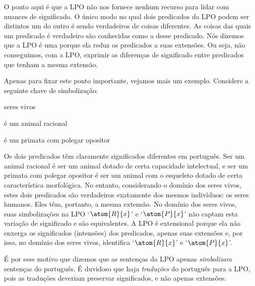 O ponto aqui é que a LPO não nos fornece nenhum recurso para lidar com nuances de significado.
O único modo no qual dois predicados da LPO podem ser distintos um do outro é sendo verdadeiros de coisas diferentes.
As coisas das quais um predicado é verdadeiro são conhecidas como a  desse predicado.
Nós dizemos que a LPO é uma  porque ela reduz os predicados a suas extensões.
Ou seja, não conseguimos, com a LPO, exprimir as diferenças de significado entre predicados que tenham a mesma extensão.    

Apenas para fixar este ponto importante, vejamos mais um exemplo.
Considere a seguinte chave de simbolização:
\begin{center}
	\begin{ekey}
		\item[\text{domínio}] seres vivos
		\item[\atom{R}{x}]  é um animal racional
		\item[\atom{P}{x}]  é um primata com polegar opositor
	\end{ekey}
\end{center}
Os dois predicados têm claramente significados diferentes em português.
Ser um animal racional é ser um animal dotado de certa capacidade intelectual, e ser um primata com polegar opositor é ser um animal com o esqueleto dotado de certa característica morfológica.
No entanto, considerando o domínio dos seres vivos, estes dois predicados são verdadeiros exatamente dos mesmos indivíduos:
os seres humanos.
Eles têm, portanto, a mesma extensão.
No domínio dos seres vivos, suas simbolizações na LPO `$\atom{R}{x}$' e `$\atom{P}{x}$' não captam esta variação de significado e são equivalentes.
A LPO é extensional porque ela não enxerga os significados (intensões) dos predicados, apenas suas extensões e, por isso, no domínio dos seres vivos, identifica `$\atom{R}{x}$' e `$\atom{P}{x}$'.

É por esse motivo que dizemos que as sentenças da LPO apenas \emph{simbolizam} sentenças do português.
É duvidoso que haja \emph{traduções} do português para a LPO, pois as traduções deveriam preservar significados, e não apenas extensões.


